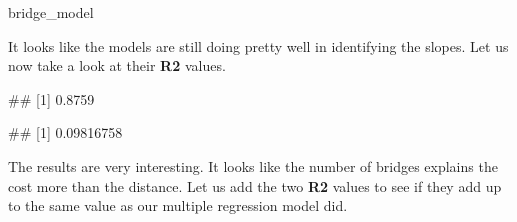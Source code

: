 \documentclass[
]{book}
\newenvironment{Shaded}{\begin{snugshade}}{\end{snugshade}}
\newcommand{\FunctionTok}[1]{\textcolor[rgb]{0.13,0.29,0.53}{\textbf{#1}}}
\newcommand{\NormalTok}[1]{#1}
\newcommand{\SpecialCharTok}[1]{\textcolor[rgb]{0.81,0.36,0.00}{\textbf{#1}}}
\begin{document}
\begin{Shaded}
\begin{Highlighting}[]
\NormalTok{bridge\_model}
\end{Highlighting}
\end{Shaded}

\begin{Shaded}
\end{Shaded}

It looks like the models are still doing pretty well in identifying the slopes. Let us now take a look at their \textbf{R2} values.

\begin{Shaded}
\end{Shaded}

\begin{Shaded}
\begin{Highlighting}[]
\NormalTok{\#\# [1] 0.8759}
\end{Highlighting}
\end{Shaded}

\begin{Shaded}
\end{Shaded}

\begin{Shaded}
\begin{Highlighting}[]
\NormalTok{\#\# [1] 0.09816758}
\end{Highlighting}
\end{Shaded}

The results are very interesting. It looks like the number of bridges explains the cost more than the distance. Let us add the two \textbf{R2} values to see if they add up to the same value as our multiple regression model did.
\end{document}
